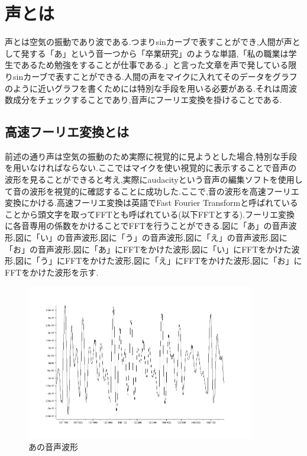 \documentclass[12pt,oneside]{sotsuken_paper}
\begin{document}
\section{声とは}
声とは空気の振動であり波である.つまりsinカーブで表すことができ,人間が声として発する「あ」という音一つから「卒業研究」のような単語,「私の職業は学生であるため勉強をすることが仕事である.」と言った文章を声で発している限りsinカーブで表すことができる.人間の声をマイクに入れてそのデータをグラフのように近いグラフを書くためには特別な手段を用いる必要がある.それは周波数成分をチェックすることであり,音声にフーリエ変換を掛けることである.


\subsection{高速フーリエ変換とは}
前述の通り声は空気の振動のため実際に視覚的に見ようとした場合,特別な手段を用いなければならない.ここではマイクを使い視覚的に表示することで音声の波形を見ることができると考え,実際にaudacityという音声の編集ソフトを使用して音の波形を視覚的に確認することに成功した.ここで,音の波形を高速フーリエ変換にかける.高速フーリエ変換は英語でFast Fourier Transformと呼ばれていることから頭文字を取ってFFTとも呼ばれている(以下FFTとする).フーリエ変換に各音専用の係数をかけることでFFTを行うことができる.図\label{fig:voice-a}に「あ」の音声波形,図\label{fig:voice-i}に「い」の音声波形,図\label{fig:voice-u}に「う」の音声波形,図\label{fig:voice-e}に「え」の音声波形,図\label{fig:voice-o}に「お」の音声波形,図\label{fig:a_fft}に「あ」にFFTをかけた波形,図\label{fig:i_fft}に「い」にFFTをかけた波形,図\label{fig:u_fft}に「う」にFFTをかけた波形,図\label{fig:e_fft}に「え」にFFTをかけた波形,図\label{fig:o_fft}に「お」にFFTをかけた波形を示す.


\begin{figure}[htbp]
\begin{center}
\includegraphics[width=100mm]{img/a.png}
\caption{あの音声波形}
\label{fig:voice-a}
\end{center}
\end{figure}
\end{document}
